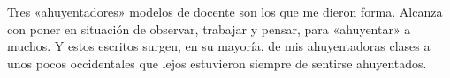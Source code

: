 Tres «ahuyentadores» modelos de docente son los que me dieron forma. Alcanza con poner en situación de observar, trabajar y pensar, para «ahuyentar» a muchos. Y estos escritos surgen, en su mayoría, de mis ahuyentadoras clases a unos pocos occidentales que lejos estuvieron siempre de sentirse ahuyentados.